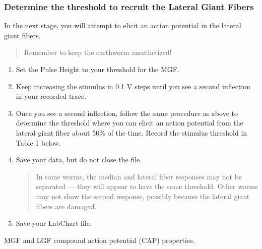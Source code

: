 \documentclass[letterpaper,10pt,english]{jupyterBook}
\begin{document}
\subsubsection{Determine the threshold to recruit the Lateral Giant Fibers}
\label{\detokenize{Earthworm:determine-the-threshold-to-recruit-the-lateral-giant-fibers}}
\sphinxAtStartPar
In the next stage, you will attempt to elicit an action potential in the lateral giant fibers.
\begin{quote}

\sphinxAtStartPar
{} Remember to keep the earthworm anesthetized!
\end{quote}
\begin{enumerate}
%
\item {} 
\sphinxAtStartPar
Set the Pulse Height to your threshold for the MGF.

\item {} 
\sphinxAtStartPar
Keep increasing the stimulus in 0.1 V steps until you see a second inflection in your recorded trace.

\item {} 
\sphinxAtStartPar
Once you see a second inflection, follow the same procedure as above to determine the threshold where you can elicit an action potential from the lateral giant fiber about 50\% of the time. Record the stimulus threshold in Table 1 below.

\item {} 
\sphinxAtStartPar
Save your data, but do not close the file.
\begin{quote}

\sphinxAtStartPar
{} In some worms, the median and lateral fiber responses may not be separated — they will appear to have the same threshold. Other worms may not show the second response, possibly because the lateral giant fibers are damaged.
\end{quote}

\item {} 
\sphinxAtStartPar
Save your LabChart file.

\end{enumerate}

\sphinxAtStartPar
{} MGF and LGF compound action potential (CAP) properties.
\end{document}
